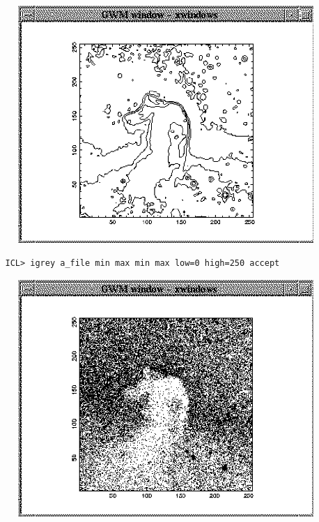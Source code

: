 \begin{latexonly}
\begin{figure}[htb]
\begin{center}
\includegraphics{sun86_icont.eps}
\end{center}
\end{figure}
\end{latexonly}

\begin{verbatim}
   ICL> igrey a_file min max min max low=0 high=250 accept
\end{verbatim}

\begin{latexonly}
\begin{figure}[htb]
\begin{center}
\includegraphics{sun86_igrey.eps}
\end{center}
\end{figure}
\end{latexonly}

